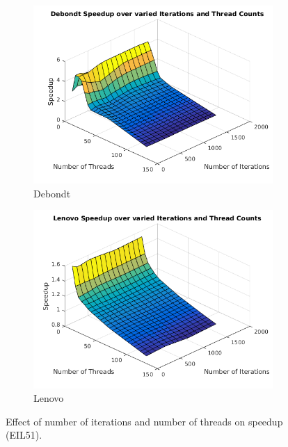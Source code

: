 \documentclass[10pt,letterpaper]{article}
\begin{document}
\begin{figure}[t]
\centering
   \begin{subfigure}{0.49\linewidth} \centering
	\includegraphics[width=\textwidth]{../img/Debondt_IterationvsThreads.png} 
     \caption{Debondt}\label{fig:figA}
   \end{subfigure}
   \begin{subfigure}{0.49\linewidth} \centering
	\includegraphics[width=\textwidth]{../img/Lenovo_IterationvsThreads.png}
     \caption{Lenovo}\label{fig:figB}
   \end{subfigure}
\caption{Effect of number of iterations and number of threads on speedup (EIL51).} \label{fig:itervsthreads}
\end{figure}
 
\end{document}
